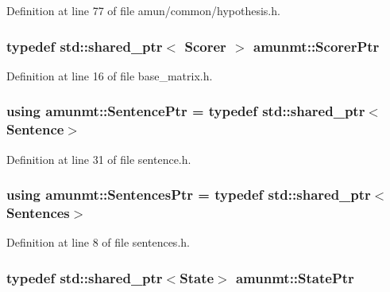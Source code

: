 Definition at line 77 of file amun/common/hypothesis.\+h.

\subsubsection[{\texorpdfstring{Scorer\+Ptr}{ScorerPtr}}]{\setlength{\rightskip}{0pt plus 5cm}typedef std\+::shared\+\_\+ptr$<$ {\bf Scorer} $>$ {\bf amunmt\+::\+Scorer\+Ptr}}\hypertarget{namespaceamunmt_a703e88438d533fef1db5cc95060b36f0}{}\label{namespaceamunmt_a703e88438d533fef1db5cc95060b36f0}


Definition at line 16 of file base\+\_\+matrix.\+h.

\subsubsection[{\texorpdfstring{Sentence\+Ptr}{SentencePtr}}]{\setlength{\rightskip}{0pt plus 5cm}using {\bf amunmt\+::\+Sentence\+Ptr} = typedef std\+::shared\+\_\+ptr$<${\bf Sentence}$>$}\hypertarget{namespaceamunmt_a79f0566b0c1ac270d350b2912a3be4a4}{}\label{namespaceamunmt_a79f0566b0c1ac270d350b2912a3be4a4}


Definition at line 31 of file sentence.\+h.

\subsubsection[{\texorpdfstring{Sentences\+Ptr}{SentencesPtr}}]{\setlength{\rightskip}{0pt plus 5cm}using {\bf amunmt\+::\+Sentences\+Ptr} = typedef std\+::shared\+\_\+ptr$<${\bf Sentences}$>$}\hypertarget{namespaceamunmt_a06c5762b84aba68e6c69fb409e57829e}{}\label{namespaceamunmt_a06c5762b84aba68e6c69fb409e57829e}


Definition at line 8 of file sentences.\+h.

\subsubsection[{\texorpdfstring{State\+Ptr}{StatePtr}}]{\setlength{\rightskip}{0pt plus 5cm}typedef std\+::shared\+\_\+ptr$<${\bf State}$>$ {\bf amunmt\+::\+State\+Ptr}}\hypertarget{namespaceamunmt_a1ea9a0b24d777d2c8dc94c4189c6c359}{}\label{namespaceamunmt_a1ea9a0b24d777d2c8dc94c4189c6c359}


